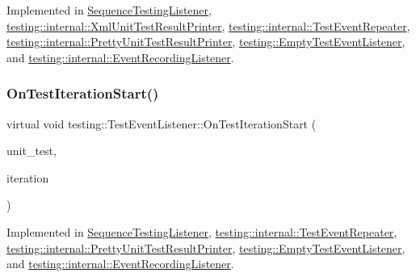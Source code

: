 Implemented in \hyperlink{class_sequence_testing_listener_a783bc01e2a95f5bf73bbde4d96832e0f}{Sequence\+Testing\+Listener}, \hyperlink{classtesting_1_1internal_1_1_xml_unit_test_result_printer_a2ae986dd2f4f2aed31cc6f3bc8c56898}{testing\+::internal\+::\+Xml\+Unit\+Test\+Result\+Printer}, \hyperlink{classtesting_1_1internal_1_1_test_event_repeater_a94253e3c11753328e8a031f39352708f}{testing\+::internal\+::\+Test\+Event\+Repeater}, \hyperlink{classtesting_1_1internal_1_1_pretty_unit_test_result_printer_ac29b30216023baddda04ef5889f484ff}{testing\+::internal\+::\+Pretty\+Unit\+Test\+Result\+Printer}, \hyperlink{classtesting_1_1_empty_test_event_listener_a2253e5a18b3cf7bccd349567a252209d}{testing\+::\+Empty\+Test\+Event\+Listener}, and \hyperlink{classtesting_1_1internal_1_1_event_recording_listener_ab0cc007bcfaf06cd383d574c88f62aea}{testing\+::internal\+::\+Event\+Recording\+Listener}.

\mbox{\label{classtesting_1_1_test_event_listener_a60cc09b7907cb329d152eb5e7133bdeb}} 
\subsubsection{\texorpdfstring{On\+Test\+Iteration\+Start()}{OnTestIterationStart()}}
{\footnotesize\ttfamily virtual void testing\+::\+Test\+Event\+Listener\+::\+On\+Test\+Iteration\+Start (\begin{DoxyParamCaption}\item[{const \hyperlink{classtesting_1_1_unit_test}{Unit\+Test} \&}]{unit\+\_\+test,  }\item[{int}]{iteration }\end{DoxyParamCaption})\hspace{0.3cm}{\ttfamily [pure virtual]}}



Implemented in \hyperlink{class_sequence_testing_listener_a345641262fa10cc4b251ac54116db74b}{Sequence\+Testing\+Listener}, \hyperlink{classtesting_1_1internal_1_1_test_event_repeater_a4062b3f070bb6531ab8494c13d3635d3}{testing\+::internal\+::\+Test\+Event\+Repeater}, \hyperlink{classtesting_1_1internal_1_1_pretty_unit_test_result_printer_abdba10a8c97e272ab4cee97cb652c957}{testing\+::internal\+::\+Pretty\+Unit\+Test\+Result\+Printer}, \hyperlink{classtesting_1_1_empty_test_event_listener_a836f05829855dc60d13ba99ad712c0dd}{testing\+::\+Empty\+Test\+Event\+Listener}, and \hyperlink{classtesting_1_1internal_1_1_event_recording_listener_a0bfa276def9594b2a119c2c370f59281}{testing\+::internal\+::\+Event\+Recording\+Listener}.


